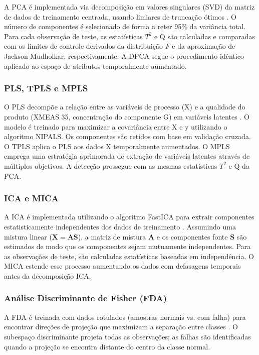 \documentclass[journal]{IEEEtran}
\begin{document}
A PCA é implementada via decomposição em valores singulares (SVD) da matriz de dados de treinamento centrada, usando limiares de truncação ótimos \cite{gavish2014}. O número de componentes é selecionado de forma a reter 95\% da variância total. Para cada observação de teste, as estatísticas $T^2$ e Q são calculadas e comparadas com os limites de controle derivados da distribuição $F$ e da aproximação de Jackson-Mudholkar, respectivamente. A DPCA segue o procedimento idêntico aplicado ao espaço de atributos temporalmente aumentado.

\subsubsection{PLS, TPLS e MPLS}

O PLS decompõe a relação entre as variáveis de processo (X) e a qualidade do produto (XMEAS 35, concentração do componente G) em variáveis latentes \cite{dayal1997}. O modelo é treinado para maximizar a covariância entre X e y utilizando o algoritmo NIPALS. Os componentes são retidos com base em validação cruzada. O TPLS aplica o PLS aos dados X temporalmente aumentados. O MPLS emprega uma estratégia aprimorada de extração de variáveis latentes através de múltiplos objetivos. A detecção prossegue com as mesmas estatísticas $T^2$ e Q da PCA.

\subsubsection{ICA e MICA}

A ICA é implementada utilizando o algoritmo FastICA para extrair componentes estatisticamente independentes dos dados de treinamento \cite{yin2012}. Assumindo uma mistura linear ($\mathbf{X} = \mathbf{A} \mathbf{S}$), a matriz de mistura $\mathbf{A}$ e os componentes fonte $\mathbf{S}$ são estimados de modo que os componentes sejam mutuamente independentes. Para as observações de teste, são calculadas estatísticas baseadas em independência. O MICA estende esse processo aumentando os dados com defasagens temporais antes da decomposição ICA.


\subsubsection{Análise Discriminante de Fisher (FDA)}

A FDA é treinada com dados rotulados (amostras normais vs. com falha) para encontrar direções de projeção que maximizam a separação entre classes \cite{yin2012}. O subespaço discriminante projeta todas as observações; as falhas são identificadas quando a projeção se encontra distante do centro da classe normal.
\end{document}
